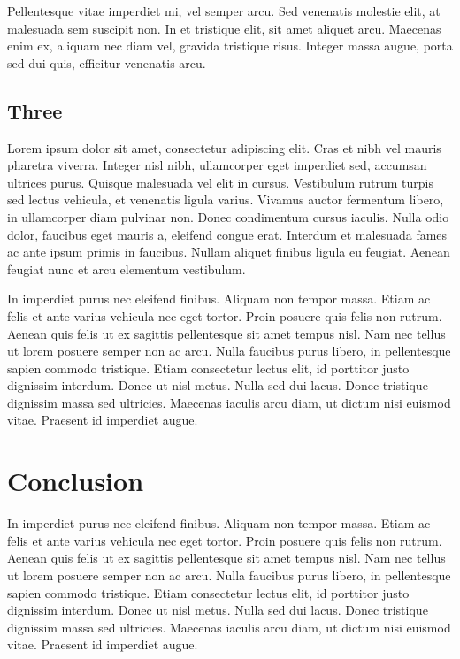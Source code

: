 


Pellentesque vitae imperdiet mi, vel semper arcu. Sed venenatis molestie elit, at malesuada sem suscipit non. In et tristique elit, sit amet aliquet arcu. Maecenas enim ex, aliquam nec diam vel, gravida tristique risus. Integer massa augue, porta sed dui quis, efficitur venenatis arcu.

\subsection{Three}
\label{sub:three}

Lorem ipsum dolor sit amet, consectetur adipiscing elit. Cras et nibh vel mauris pharetra viverra. Integer nisl nibh, ullamcorper eget imperdiet sed, accumsan ultrices purus. Quisque malesuada vel elit in cursus. Vestibulum rutrum turpis sed lectus vehicula, et venenatis ligula varius. Vivamus auctor fermentum libero, in ullamcorper diam pulvinar non. Donec condimentum cursus iaculis. Nulla odio dolor, faucibus eget mauris a, eleifend congue erat. Interdum et malesuada fames ac ante ipsum primis in faucibus. Nullam aliquet finibus ligula eu feugiat. Aenean feugiat nunc et arcu elementum vestibulum.

In imperdiet purus nec eleifend finibus. Aliquam non tempor massa. Etiam ac felis et ante varius vehicula nec eget tortor. Proin posuere quis felis non rutrum. Aenean quis felis ut ex sagittis pellentesque sit amet tempus nisl. Nam nec tellus ut lorem posuere semper non ac arcu. Nulla faucibus purus libero, in pellentesque sapien commodo tristique. Etiam consectetur lectus elit, id porttitor justo dignissim interdum. Donec ut nisl metus. Nulla sed dui lacus. Donec tristique dignissim massa sed ultricies. Maecenas iaculis arcu diam, ut dictum nisi euismod vitae. Praesent id imperdiet augue.


\section{Conclusion}
\label{sec:survey_conclusion}

In imperdiet purus nec eleifend finibus. Aliquam non tempor massa. Etiam ac felis et ante varius vehicula nec eget tortor. Proin posuere quis felis non rutrum. Aenean quis felis ut ex sagittis pellentesque sit amet tempus nisl. Nam nec tellus ut lorem posuere semper non ac arcu. Nulla faucibus purus libero, in pellentesque sapien commodo tristique. Etiam consectetur lectus elit, id porttitor justo dignissim interdum. Donec ut nisl metus. Nulla sed dui lacus. Donec tristique dignissim massa sed ultricies. Maecenas iaculis arcu diam, ut dictum nisi euismod vitae. Praesent id imperdiet augue.

